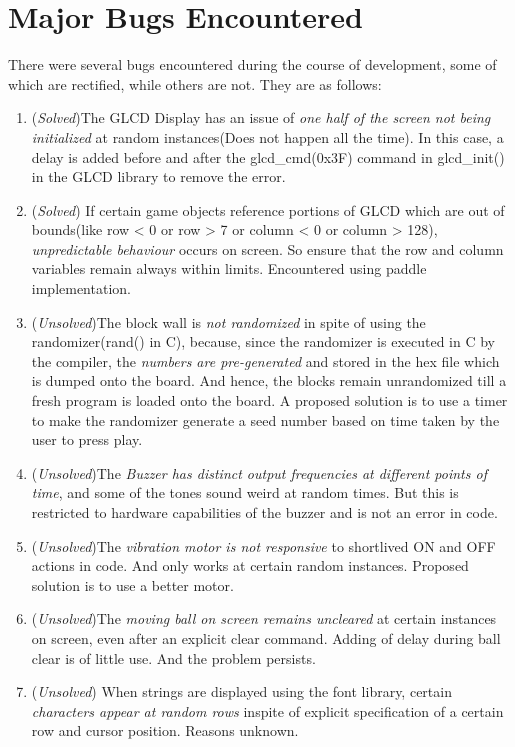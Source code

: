 \documentclass[a4paper,12pt,oneside]{book}
\begin{document}
\section{Major Bugs Encountered}
\qquad There were several bugs encountered during the course of development, some of which are rectified, while others are not. They are as follows:
\begin{enumerate}
\item (\textit{Solved})The GLCD Display has an issue of \textit{one half of the screen not being initialized} at random instances(Does not happen all the time). In this case, a delay is added before and after the glcd\_cmd(0x3F) command in glcd\_init() in the GLCD library to remove the error.
\item (\textit{Solved}) If certain game objects reference portions of GLCD which are out of bounds(like row < 0 or row > 7 or column < 0 or column > 128), \textit{unpredictable behaviour} occurs on screen. So ensure that the row and column variables remain always within limits. Encountered using paddle implementation.
\item (\textit{Unsolved})The block wall is \textit{not randomized} in spite of using the randomizer(rand() in C), because, since the randomizer is executed in C by the compiler, the \textit{numbers are pre-generated} and stored in the hex file which is dumped onto the board. And hence, the blocks remain unrandomized till a fresh program is loaded onto the board. A proposed solution is to use a timer to make the randomizer generate a seed number based on time taken by the user to press play. 
\item (\textit{Unsolved})The \textit{Buzzer has distinct output frequencies at different points of time}, and some of the tones sound weird at random times. But this is restricted to hardware capabilities of the buzzer and is not an error in code. 
\item (\textit{Unsolved})The \textit{vibration motor is not responsive} to shortlived ON and OFF actions in code. And only works at certain random instances. Proposed solution is to use a better motor.
\item (\textit{Unsolved})The \textit{moving ball on screen remains uncleared} at certain instances on screen, even after an explicit clear command. Adding of delay during ball clear is of little use. And the problem persists.
\item (\textit{Unsolved}) When strings are displayed using the font library, certain \textit{characters appear at random rows} inspite of explicit specification of a certain row and cursor position. Reasons unknown. 
\end{enumerate}
\end{document}
